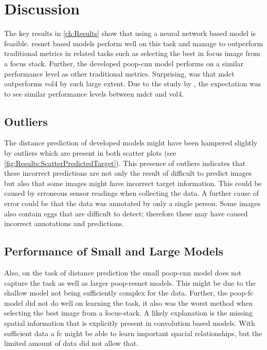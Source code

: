 \chapter{Discussion}
\label{ch:Discussion}

The key results in \autoref{ch:Results} show that using a neural network based model is feasible. \Ac{resnet} based models perform well on this task and manage to outperform traditional metrics in related tasks such as selecting the best in focus image from a focus stack. Further, the developed \ac{poop}-\ac{cnn} model performs on a similar performance level as other traditional metrics. Surprising, was that \ac{mdct} outperforms \ac{vol4} by such large extent. Due to the study by \textcite{mateos-perez2012comparative}, the expectation was to see similar performance levels between \ac{mdct} and \ac{vol4}.

\section{Outliers}
\label{ch:Discussion:Outliers}

The distance prediction of developed models might have been hampered slightly by outliers which are present in both scatter plots (see \autoref{fig:Results:ScatterPredictedTarget}). This presence of outliers indicates that these incorrect predictions are not only the result of difficult to predict images but also that some images might have incorrect target information. This could be caused by erroneous sensor readings when collecting the data. A further cause of error could be that the data was annotated by only a single person. Some images also contain eggs that are difficult to detect; therefore these may have caused incorrect annotations and predictions.

\section{Performance of Small and Large Models}
\label{ch:Discussion:SmallandLarge}

Also, on the task of distance prediction the small \ac{poop}-\ac{cnn} model does not capture the task as well as larger \ac{poop}-\ac{resnet} models. This might be due to the shallow model not being sufficiently complex for the data. Further, the \ac{poop}-\ac{fc} model did not do well on learning the task, it also was the worst method when selecting the best image from a focus-stack. A likely explanation is the missing spatial information that is explicitly present in convolution based models. With sufficient data a \ac{fc} might be able to learn important spacial relationships, but the limited amount of data did not allow that.

